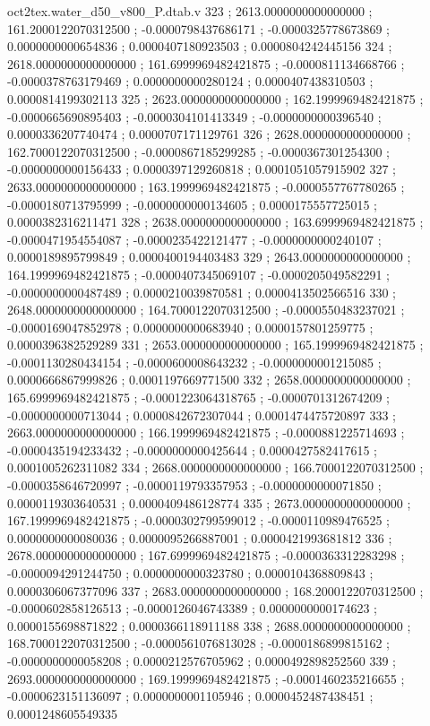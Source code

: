 \begin{filecontents}[overwrite]{oct2tex.water_d50_v800_P.dtab.v}
323 ; 2613.0000000000000000 ; 161.2000122070312500 ; -0.0000798437686171 ; -0.0000325778673869 ; 0.0000000000654836 ; 0.0000407180923503 ; 0.0000804242445156
324 ; 2618.0000000000000000 ; 161.6999969482421875 ; -0.0000811134668766 ; -0.0000378763179469 ; 0.0000000000280124 ; 0.0000407438310503 ; 0.0000814199302113
325 ; 2623.0000000000000000 ; 162.1999969482421875 ; -0.0000665690895403 ; -0.0000304101413349 ; -0.0000000000396540 ; 0.0000336207740474 ; 0.0000707171129761
326 ; 2628.0000000000000000 ; 162.7000122070312500 ; -0.0000867185299285 ; -0.0000367301254300 ; -0.0000000000156433 ; 0.0000397129260818 ; 0.0001051057915902
327 ; 2633.0000000000000000 ; 163.1999969482421875 ; -0.0000557767780265 ; -0.0000180713795999 ; -0.0000000000134605 ; 0.0000175557725015 ; 0.0000382316211471
328 ; 2638.0000000000000000 ; 163.6999969482421875 ; -0.0000471954554087 ; -0.0000235422121477 ; -0.0000000000240107 ; 0.0000189895799849 ; 0.0000400194403483
329 ; 2643.0000000000000000 ; 164.1999969482421875 ; -0.0000407345069107 ; -0.0000205049582291 ; -0.0000000000487489 ; 0.0000210039870581 ; 0.0000413502566516
330 ; 2648.0000000000000000 ; 164.7000122070312500 ; -0.0000550483237021 ; -0.0000169047852978 ; 0.0000000000683940 ; 0.0000157801259775 ; 0.0000396382529289
331 ; 2653.0000000000000000 ; 165.1999969482421875 ; -0.0001130280434154 ; -0.0000600008643232 ; -0.0000000001215085 ; 0.0000666867999826 ; 0.0001197669771500
332 ; 2658.0000000000000000 ; 165.6999969482421875 ; -0.0001223064318765 ; -0.0000701312674209 ; -0.0000000000713044 ; 0.0000842672307044 ; 0.0001474475720897
333 ; 2663.0000000000000000 ; 166.1999969482421875 ; -0.0000881225714693 ; -0.0000435194233432 ; -0.0000000000425644 ; 0.0000427582417615 ; 0.0001005262311082
334 ; 2668.0000000000000000 ; 166.7000122070312500 ; -0.0000358646720997 ; -0.0000119793357953 ; -0.0000000000071850 ; 0.0000119303640531 ; 0.0000409486128774
335 ; 2673.0000000000000000 ; 167.1999969482421875 ; -0.0000302799599012 ; -0.0000110989476525 ; 0.0000000000080036 ; 0.0000095266887001 ; 0.0000421993681812
336 ; 2678.0000000000000000 ; 167.6999969482421875 ; -0.0000363312283298 ; -0.0000094291244750 ; 0.0000000000323780 ; 0.0000104368809843 ; 0.0000306067377096
337 ; 2683.0000000000000000 ; 168.2000122070312500 ; -0.0000602858126513 ; -0.0000126046743389 ; 0.0000000000174623 ; 0.0000155698871822 ; 0.0000366118911188
338 ; 2688.0000000000000000 ; 168.7000122070312500 ; -0.0000561076813028 ; -0.0000186899815162 ; -0.0000000000058208 ; 0.0000212576705962 ; 0.0000492898252560
339 ; 2693.0000000000000000 ; 169.1999969482421875 ; -0.0001460235216655 ; -0.0000623151136097 ; 0.0000000001105946 ; 0.0000452487438451 ; 0.0001248605549335

\end{filecontents}
